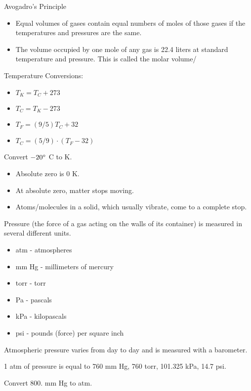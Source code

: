 \documentclass[../hchem.tex]{subfiles}
\begin{document}
Avogadro's Principle
\begin{itemize}
    \item Equal volumes of gases contain equal numbers of moles of those gases if the temperatures and pressures are the same.
    \item The volume occupied by one mole of any gas is 22.4 liters at standard temperature and pressure. This is called the molar volume/
\end{itemize}

Temperature Conversions:
\begin{itemize}
    \item $T_K = T_C +273$
    \item $T_C = T_K-273$
    \item $T_F = (9/5)T_C+32$
    \item $T_C = (5/9)\cdot (T_F-32)$
\end{itemize}

\ex Convert $-20\degree$ C to K.

\begin{itemize}
    \item Absolute zero is 0 K.
    \item At absolute zero, matter stops moving.
    \item Atoms/molecules in a solid, which usually vibrate, come to a complete stop.
\end{itemize}

Pressure (the force of a gas acting on the walls of its container) is measured in several different units.
\begin{itemize}
    \item atm - atmospheres 
    \item mm Hg - millimeters of mercury 
    \item torr - torr
    \item Pa - pascals
    \item kPa - kilopascals 
    \item psi - pounds (force) per square inch
\end{itemize}

Atmospheric pressure varies from day to day and is measured with a barometer.

1 atm of pressure is equal to 760 mm Hg, 760 torr, 101.325 kPa, 14.7 psi.

\ex Convert 800. mm Hg to atm.
\end{document}
